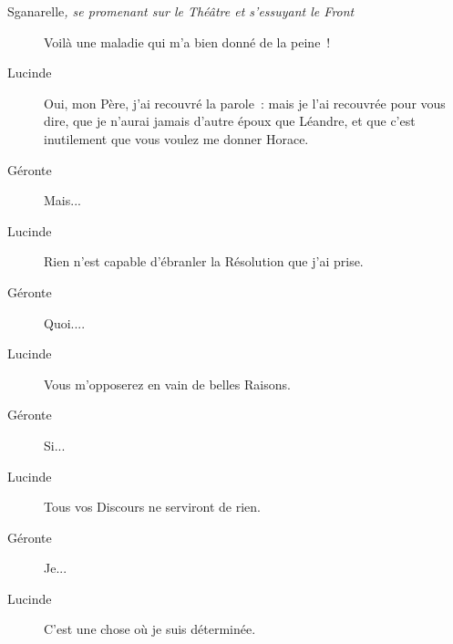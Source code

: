 \documentclass[french,twoside]{book} %
\begin{document}
 \begin{description} \item[Sganarelle\textit{, se promenant sur le Théâtre et s’essuyant le Front}\par
] 

Voilà une maladie qui m’a bien donné de la peine !\end{description}
 \begin{description} \item[Lucinde] 

Oui, mon Père, j’ai recouvré la parole : mais je l’ai recouvrée pour vous dire, que je n’aurai jamais d’autre époux que Léandre, et que c’est inutilement que vous voulez me donner Horace.\end{description}
 \begin{description} \item[Géronte] 

Mais...\end{description}
 \begin{description} \item[Lucinde] 

Rien n’est capable d’ébranler la Résolution que j’ai prise.\end{description}
 \begin{description} \item[Géronte] 

Quoi....\end{description}
 \begin{description} \item[Lucinde] 

Vous m’opposerez en vain de belles Raisons.\end{description}
 \begin{description} \item[Géronte] 

Si...\end{description}
 \begin{description} \item[Lucinde] 

Tous vos Discours ne serviront de rien.\end{description}
 \begin{description} \item[Géronte] 

Je...\end{description}
 \begin{description} \item[Lucinde] 

C’est une chose où je suis déterminée.\end{description}
\end{document}

